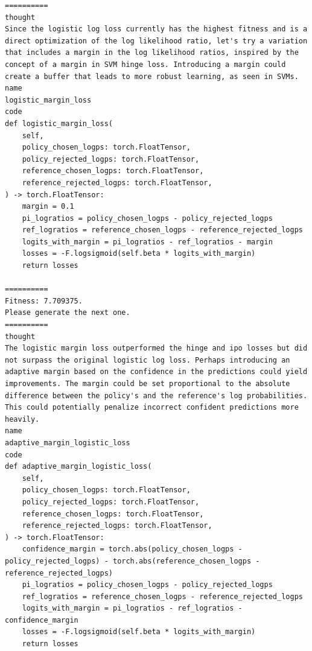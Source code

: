 \documentclass{article}
\theoremstyle{plain}
\theoremstyle{definition}
\theoremstyle{remark}
\begin{document}
\begin{lstlisting}
==========
thought
Since the logistic log loss currently has the highest fitness and is a direct optimization of the log likelihood ratio, let's try a variation that includes a margin in the log likelihood ratios, inspired by the concept of a margin in SVM hinge loss. Introducing a margin could create a buffer that leads to more robust learning, as seen in SVMs.
name
logistic_margin_loss
code
def logistic_margin_loss(
    self,
    policy_chosen_logps: torch.FloatTensor,
    policy_rejected_logps: torch.FloatTensor,
    reference_chosen_logps: torch.FloatTensor,
    reference_rejected_logps: torch.FloatTensor,
) -> torch.FloatTensor:
    margin = 0.1
    pi_logratios = policy_chosen_logps - policy_rejected_logps
    ref_logratios = reference_chosen_logps - reference_rejected_logps
    logits_with_margin = pi_logratios - ref_logratios - margin
    losses = -F.logsigmoid(self.beta * logits_with_margin)
    return losses
    
==========
Fitness: 7.709375.
Please generate the next one.
==========
thought
The logistic margin loss outperformed the hinge and ipo losses but did not surpass the original logistic log loss. Perhaps introducing an adaptive margin based on the confidence in the predictions could yield improvements. The margin could be set proportional to the absolute difference between the policy's and the reference's log probabilities. This could potentially penalize incorrect confident predictions more heavily.
name
adaptive_margin_logistic_loss
code
def adaptive_margin_logistic_loss(
    self,
    policy_chosen_logps: torch.FloatTensor,
    policy_rejected_logps: torch.FloatTensor,
    reference_chosen_logps: torch.FloatTensor,
    reference_rejected_logps: torch.FloatTensor,
) -> torch.FloatTensor:
    confidence_margin = torch.abs(policy_chosen_logps - policy_rejected_logps) - torch.abs(reference_chosen_logps - reference_rejected_logps)
    pi_logratios = policy_chosen_logps - policy_rejected_logps
    ref_logratios = reference_chosen_logps - reference_rejected_logps
    logits_with_margin = pi_logratios - ref_logratios - confidence_margin
    losses = -F.logsigmoid(self.beta * logits_with_margin)
    return losses
    

\end{lstlisting}
\end{document}
